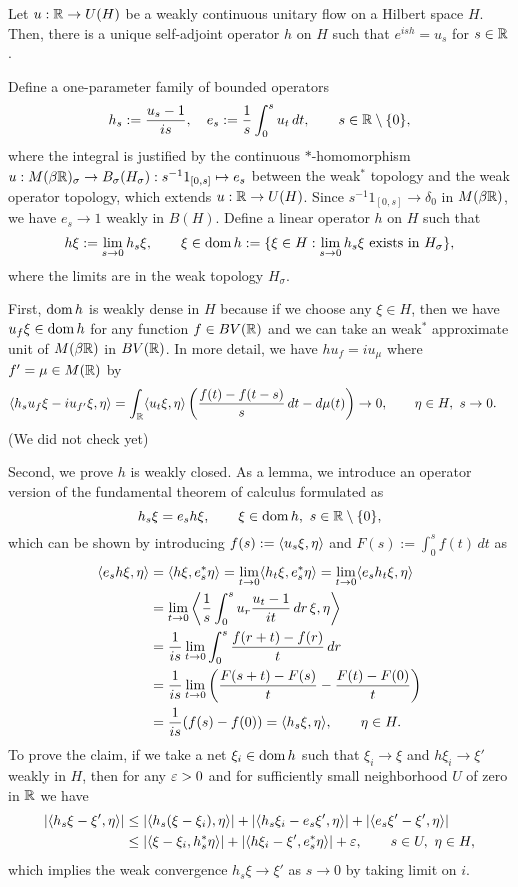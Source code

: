 \documentclass{../../large}
\begin{document}
\begin{prb}
Let $u:\mathbb{R}\to U(H)$ be a weakly continuous unitary flow on a Hilbert space $H$.
Then, there is a unique self-adjoint operator $h$ on $H$ such that $e^{ish}=u_s$ for $s\in\mathbb{R}$.
\end{prb}
\begin{pf}
Define a one-parameter family of bounded operators
\[h_s:=\frac{u_s-1}{is},\quad e_s:=\frac1s\int_0^su_t\,dt,\qquad s\in\mathbb{R}\setminus\{0\},\]
where the integral is justified by the continuous $*$-homomorphism $u:M(\beta\mathbb{R})_\sigma\to B_\sigma(H_\sigma):s^{-1}1_{[0,s]}\mapsto e_s$ between the weak$^*$ topology and the weak operator topology, which extends $u:\mathbb{R}\to U(H)$.
Since $s^{-1}1_{[0,s]}\to\delta_0$ in $M(\beta\mathbb{R})$, we have $e_s\to1$ weakly in $B(H)$.
Define a linear operator $h$ on $H$ such that
\[h\xi:=\lim_{s\to0}h_s\xi,\qquad\xi\in\operatorname{dom} h:=\{\xi\in H:\lim_{s\to0}h_s\xi\text{ exists in }H_\sigma\},\]
where the limits are in the weak topology $H_\sigma$.



First, $\operatorname{dom} h$ is weakly dense in $H$ because if we choose any $\xi\in H$, then we have $u_f\xi\in\operatorname{dom} h$ for any function $f\in BV(\mathbb{R})$ and we can take an weak$^*$ approximate unit of $M(\beta\mathbb{R})$ in $BV(\mathbb{R})$.
In more detail, we have $hu_f=iu_\mu$ where $f'=\mu\in M(\mathbb{R})$ by
\begin{align*}
\langle h_su_f\xi-iu_{f'}\xi,\eta\rangle
&=\int_{\mathbb{R}}\langle u_t\xi,\eta\rangle\left(\frac{f(t)-f(t-s)}s\,dt-d\mu(t)\right)\to0,\qquad\eta\in H,\ s\to0.
\end{align*}
(We did not check yet)

Second, we prove $h$ is weakly closed.
As a lemma, we introduce an operator version of the fundamental theorem of calculus formulated as
\[h_s\xi=e_sh\xi,\qquad\xi\in\dom h,\ s\in\R\setminus\{0\},\]
which can be shown by introducing $f(s):=\langle u_s\xi,\eta\rangle$ and $F(s):=\int_0^sf(t)\,dt$ as
\begin{align*}
\langle e_sh\xi,\eta\rangle
&=\langle h\xi,e_s^*\eta\rangle=\lim_{t\to0}\langle h_t\xi,e_s^*\eta\rangle=\lim_{t\to0}\langle e_sh_t\xi,\eta\rangle\\
&=\lim_{t\to0}\left\langle\frac1s\int_0^su_r\frac{u_t-1}{it}\,dr\,\xi,\eta\right\rangle\\
&=\frac1{is}\lim_{t\to0}\int_0^s\frac{f(r+t)-f(r)}t\,dr\\
&=\frac1{is}\lim_{t\to0}\left(\frac{F(s+t)-F(s)}t-\frac{F(t)-F(0)}t\right)\\
&=\frac1{is}(f(s)-f(0))=\langle h_s\xi,\eta\rangle,\qquad\eta\in H.
\end{align*}
To prove the claim, if we take a net $\xi_i\in\operatorname{dom} h$ such that $\xi_i\to\xi$ and $h\xi_i\to\xi'$ weakly in $H$, then for any $\varepsilon>0$ and for sufficiently small neighborhood $U$ of zero in $\mathbb{R}$ we have
\begin{align*}
|\langle h_s\xi-\xi',\eta\rangle|
&\le|\langle h_s(\xi-\xi_i),\eta\rangle|+|\langle h_s\xi_i-e_s\xi',\eta\rangle|+|\langle e_s\xi'-\xi',\eta\rangle|\\
&\le|\langle\xi-\xi_i,h_s^*\eta\rangle|+|\langle h\xi_i-\xi',e_s^*\eta\rangle|+\varepsilon,\qquad s\in U,\ \eta\in H,
\end{align*}
which implies the weak convergence $h_s\xi\to\xi'$ as $s\to 0$ by taking limit on $i$.


\end{pf}
\end{document}
